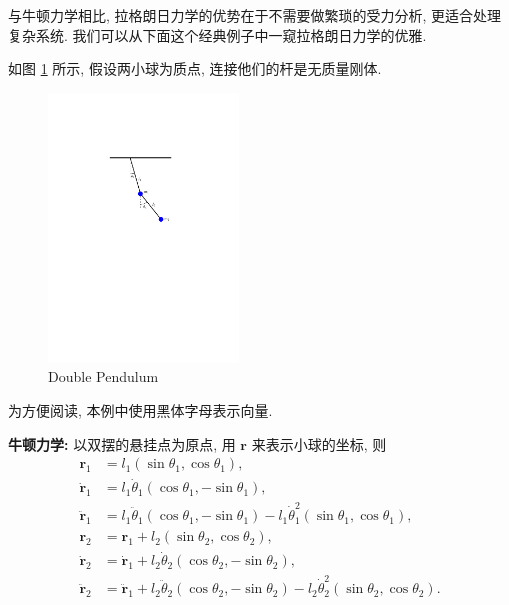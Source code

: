 与牛顿力学相比, 拉格朗日力学的优势在于不需要做繁琐的受力分析, 更适合处理复杂系统. 我们可以从下面这个经典例子中一窥拉格朗日力学的优雅.

\begin{example}[双摆]
    如图 \ref{double pendulum} 所示, 假设两小球为质点, 连接他们的杆是无质量刚体. 
    \begin{figure}[H]
        \centering
        \includegraphics[width=0.45\textwidth]{pic/double pendulum.pdf}
        \caption{Double Pendulum}
        \label{double pendulum}
    \end{figure}
    为方便阅读, 本例中使用黑体字母表示向量.

    {\bf 牛顿力学:} 以双摆的悬挂点为原点, 用 $ \mathbf{r} $ 来表示小球的坐标, 则 
    \begin{align*}
        \mathbf{r}_1 &= l_1(\sin\theta_1,\cos\theta_1),\\
        \dot{\mathbf{r}}_1 &= l_1\dot{\theta}_1(\cos\theta_1,-\sin\theta_1),\\ 
        \ddot{\mathbf{r}}_1 &= l_1\ddot{\theta}_1(\cos\theta_1,-\sin\theta_1)-l_1\dot{\theta}_1^2(\sin\theta_1,\cos\theta_1),\\[2ex]
        \mathbf{r}_2 &= \mathbf{r}_1+l_2(\sin\theta_2,\cos\theta_2),\\
        \dot{\mathbf{r}}_2 &= \dot{\mathbf{r}}_1+l_2\dot{\theta}_2(\cos\theta_2,-\sin\theta_2),\\ 
        \ddot{\mathbf{r}}_2 &= \ddot{\mathbf{r}}_1+l_2\ddot{\theta}_2(\cos\theta_2,-\sin\theta_2)-l_2\dot{\theta}_2^2(\sin\theta_2,\cos\theta_2).
    \end{align*}


\end{example}

